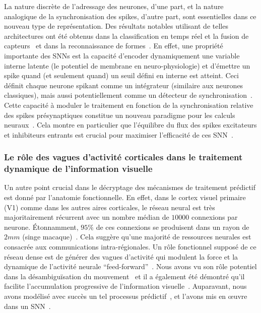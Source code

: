 La nature discrète de l'adressage des neurones, d'une part, et la nature
analogique de la synchronisation des spikes, d'autre part, sont
essentielles dans ce nouveau type de représentation. Des résultats
notables utilisant de telles architectures ont été obtenus dans la
classification en temps réel et la fusion de capteurs~\citep{Oconnor13} et dans la reconnaissance de formes~\citep{Lagorce17}. En
effet, une propriété importante des SNNs est la capacité d'encoder
dynamiquement une variable interne latente (le potentiel de membrane en
neuro-physiologie) et d'émettre un spike quand (et seulement quand) un
seuil défini en interne est atteint. Ceci définit chaque neurone spikant
comme un intégrateur (similaire aux neurones classiques), mais aussi
potentiellement comme un détecteur de synchronisation~\citep{Perrinet02}.
Cette capacité à moduler le traitement en fonction de la synchronisation
relative des spikes présynaptiques constitue un nouveau paradigme pour les
calculs neuraux~\citep{Paugam12}. Cela montre en
particulier que l'équilibre du flux des spikes excitateurs et inhibiteurs
entrants est crucial pour maximiser l'efficacité de ces SNN~\citep{Hansel12}.

\subsubsection{Le rôle des vagues d'activité corticales dans le traitement
dynamique de l'information
visuelle}
Un autre point crucial dans le décryptage des mécanismes de traitement
prédictif est donné par l'anatomie fonctionnelle. En effet, dans le
cortex visuel primaire (V1) comme dans les autres aires corticales, le
réseau neural est très majoritairement récurrent avec un nombre médian de $10000$
connexions par neurone. Étonnamment, $95 \%$ de ces connexions se
produisent dans un rayon de $2 mm$ (singe macaque)~\citep{Markov13}.
Cela suggère qu'une majorité de ressources neurales est consacrée aux
communications intra-régionales. Un rôle fonctionnel supposé de ce
réseau dense est de générer des vagues d'activité qui modulent la force
et la dynamique de l'activité neurale ``feed-forward''~\citep{Muller18}. Nous avons vu son rôle potentiel dans la désambiguïsation du
mouvement~\citep{Chemla19} et il a également été démontré qu'il
facilite l'accumulation progressive de l'information visuelle~\citep{Bringuier99}. Auparavant, nous avons modélisé avec succès un tel
processus prédictif~\citep{Perrinet12pred,Khoei13jpp,KhoeiMassonPerrinet17}, et l'avons mis en œuvre dans un SNN~\citep{Kaplan13}.

